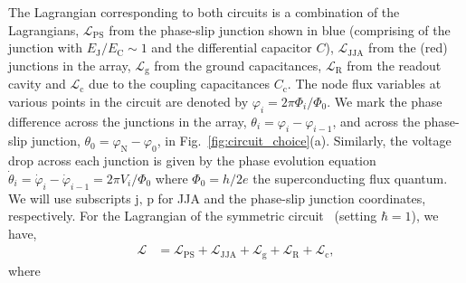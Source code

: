 \documentclass[%
reprint,
superscriptaddress,
 amsmath,amssymb,
 aps,
 prx,
longbibliography,
floatfix,
]{revtex4-2}
\begin{document}
The Lagrangian corresponding to both circuits is a combination of the Lagrangians, $\mathcal{L}_\textrm{PS}$ from the phase-slip junction shown in blue (comprising of the junction with $E_{\textrm{J}}/E_{\textrm{C}}\sim 1$ and the differential capacitor $C$), $\mathcal{L}_\textrm{JJA}$ from the (red) junctions in the array, $\mathcal{L}_\textrm{g}$ from the ground capacitances, $\mathcal{L}_\textrm{R}$ from the readout cavity and $\mathcal{L}_\textrm{c}$ due to the coupling capacitances $C_\textrm{c}$. The node flux variables at various points in the circuit are denoted by $\varphi_i=2\pi\Phi_i/\Phi_0$. We mark the phase difference across the junctions in the array, $\theta_{i}=\varphi_i-\varphi_{i-1}$, and across the phase-slip junction, $\theta_0=\varphi_\textrm{N}-\varphi_{0}$, in Fig.~\ref{fig:circuit_choice}(a). Similarly, the voltage drop across each junction is given by the phase evolution equation $\dot{\theta}_i=\dot{\varphi}_i-\dot{\varphi}_{i-1}=2\pi V_i/\Phi_0$ where $\Phi_0=h/2e$ the superconducting flux quantum. We will use subscripts $\textrm{j, p}$ for JJA and the phase-slip junction coordinates, respectively. For the Lagrangian of the symmetric circuit~\cite{viola2015collective,ferguson2013symmetries} (setting $\hbar=1$), we have, 
\begin{align}
    \mathcal{L}&=\mathcal{L}_\textrm{PS}+\mathcal{L}_{\textrm{JJA}}+\mathcal{L}_{\textrm{g}}+\mathcal{L}_{\textrm{R}}+\mathcal{L}_{\textrm{c}},
\end{align}
where
\end{document}
